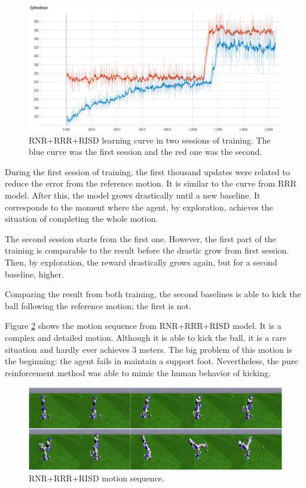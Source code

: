 \begin{figure}[!htbp]
	\centering
	\includegraphics[width=1.0\textwidth]{Cap6/rnrrrrrisdcurve.eps}
	\caption{RNR+RRR+RISD learning curve in two sessions of training. The blue curve was the first session and the red one was the second.}
	\label{fig:rnrrrrrisdcurve}
\end{figure}


During the first session of training, the first thousand updates were related to reduce the error from the reference motion. It is similar to the curve from RRR model. After this, the model grows drastically until a new baseline. It corresponds to the moment where the agent, by exploration, achieves the situation of completing the whole motion.

The second session starts from the first one. However, the first part of the training is comparable to the result before the drastic grow from first session. Then, by exploration, the reward drastically grows again, but for a second baseline, higher.

Comparing the result from both training, the second baselines is able to kick the ball following the reference motion; the first is not.

Figure \ref{fig:risdmotionsequence} shows the motion sequence from RNR+RRR+RISD model. It is a complex and detailed motion. Although it is able to kick the ball, it is a rare situation and hardly ever achieves 3 meters. The big problem of this motion is the beginning: the agent fails in maintain a support foot. Nevertheless, the pure reinforcement method was able to mimic the human behavior of kicking.

\begin{figure}[!htbp]
	\centering
	\includegraphics[width=1.0\textwidth]{Cap6/risdmotionsequence.eps}
	\caption{RNR+RRR+RISD motion sequence.}
	\label{fig:risdmotionsequence}
\end{figure}


